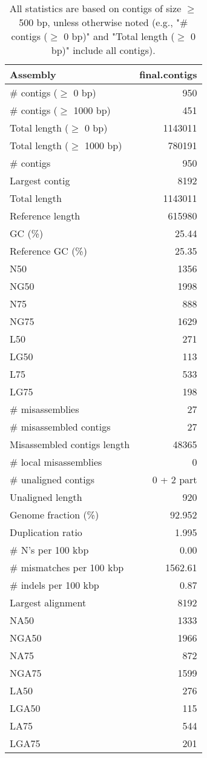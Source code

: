 \documentclass[12pt,a4paper]{article}
\begin{document}
\begin{table}[ht]
\begin{center}
\caption{All statistics are based on contigs of size $\geq$ 500 bp, unless otherwise noted (e.g., "\# contigs ($\geq$ 0 bp)" and "Total length ($\geq$ 0 bp)" include all contigs).}
\begin{tabular}{|l*{1}{|r}|}
\hline
Assembly & final.contigs \\ \hline
\# contigs ($\geq$ 0 bp) & 950 \\ \hline
\# contigs ($\geq$ 1000 bp) & 451 \\ \hline
Total length ($\geq$ 0 bp) & 1143011 \\ \hline
Total length ($\geq$ 1000 bp) & 780191 \\ \hline
\# contigs & 950 \\ \hline
Largest contig & 8192 \\ \hline
Total length & 1143011 \\ \hline
Reference length & 615980 \\ \hline
GC (\%) & 25.44 \\ \hline
Reference GC (\%) & 25.35 \\ \hline
N50 & 1356 \\ \hline
NG50 & 1998 \\ \hline
N75 & 888 \\ \hline
NG75 & 1629 \\ \hline
L50 & 271 \\ \hline
LG50 & 113 \\ \hline
L75 & 533 \\ \hline
LG75 & 198 \\ \hline
\# misassemblies & 27 \\ \hline
\# misassembled contigs & 27 \\ \hline
Misassembled contigs length & 48365 \\ \hline
\# local misassemblies & 0 \\ \hline
\# unaligned contigs & 0 + 2 part \\ \hline
Unaligned length & 920 \\ \hline
Genome fraction (\%) & 92.952 \\ \hline
Duplication ratio & 1.995 \\ \hline
\# N's per 100 kbp & 0.00 \\ \hline
\# mismatches per 100 kbp & 1562.61 \\ \hline
\# indels per 100 kbp & 0.87 \\ \hline
Largest alignment & 8192 \\ \hline
NA50 & 1333 \\ \hline
NGA50 & 1966 \\ \hline
NA75 & 872 \\ \hline
NGA75 & 1599 \\ \hline
LA50 & 276 \\ \hline
LGA50 & 115 \\ \hline
LA75 & 544 \\ \hline
LGA75 & 201 \\ \hline
\end{tabular}
\end{center}
\end{table}
\end{document}
